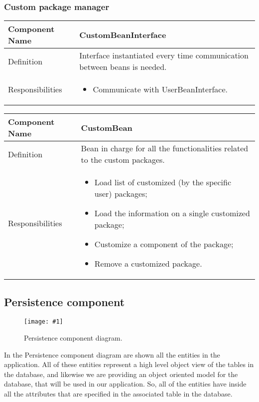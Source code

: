 \documentclass[a4paper,12pt]{book}
\newcommand{\insimg}[3]{
  \begin{figure}[H]
    \begin{center}
      \texttt{[image: \#1]}
    \end{center}
    \caption{#2}
    \label{fig:#1}
  \end{figure}
}
\begin{document}
\subsubsection{Custom package manager}
\begin{center}
  \begin{tabular}{ | p{3.3cm} | p{11.7cm} | }
    \hline
    Component Name & \textbf{CustomBeanInterface} \\ \hline
    Definition & Interface instantiated every time communication between beans is needed. \\ \hline
    Responsibilities & \parbox{0.65\textwidth}{
      \begin{itemize}[noitemsep,leftmargin=*]
        \item Communicate with UserBeanInterface.
      \end{itemize}} \\ \hline
    \end{tabular}
  \end{center}
  \begin{center}
    \begin{tabular}{ | p{3.3cm} | p{11.7cm} | }
      \hline
      Component Name & \textbf{CustomBean} \\ \hline
      Definition & Bean in charge for all the functionalities related to the custom packages. \\ \hline
      Responsibilities & \parbox{0.65\textwidth}{
        \begin{itemize}[noitemsep,leftmargin=*]
          \item Load list of customized (by the specific user) packages;
          \item Load the information on a single customized package;
          \item Customize a component of the package;
          \item Remove a customized package.
        \end{itemize}} \\ \hline
      \end{tabular}
    \end{center}
    
\subsection{Persistence component}

\insimg{persistence-component}{Persistence component diagram.}{0.5}

In the Persistence component diagram are shown all the entities in the application. All of these entities represent a high level object view of the tables in the database, and likewise we are providing an object oriented model for the database, that will be used in our application. So, all of the entities have inside all the attributes that are specified in the associated table in the database.
\end{document}
